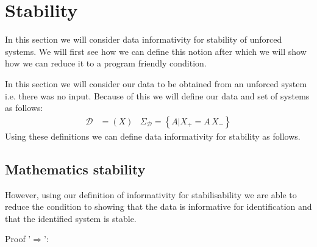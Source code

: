 \section{Stability}
In this section we will consider data informativity for stability of unforced systems. We will first see how we can define this notion after which we will show how we can reduce it to a program friendly condition.

In this section we will consider our data to be obtained from an unforced system i.e. there was no input. Because of this we will define our data and set of systems as follows:
\begin{align*}
\mathcal{D} &= (X) & \Sigma_\mathcal{D} = \left\{ A | X_+ = A \, X_- \right\}
\end{align*}
Using these definitions we can define data informativity for stability as follows.



\subsection{Mathematics stability}
However, using our definition of informativity for stabilisability we are able to reduce the condition to showing that the data is informative for identification and that the identified system is stable.


Proof '$\Rightarrow$': \\

